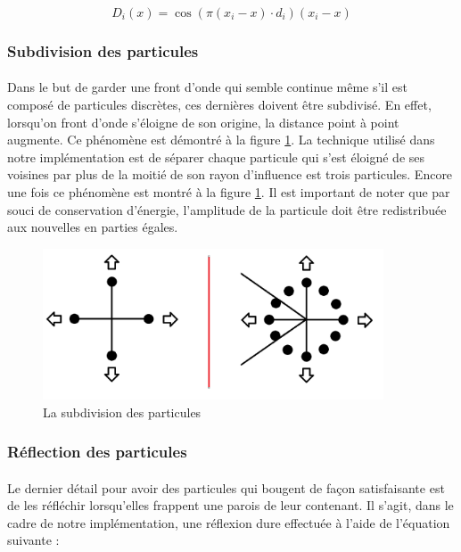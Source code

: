 \documentclass[a4paper, 12pt]{article} %
\begin{document}
	    \begin{equation}
	        D_{i}(x) = \cos(\pi {(x_{i} - x)} \cdot {d_{i}}) {(x_{i} - x)}
	    \end{equation}

	\subsubsection{Subdivision des particules}
	    \paragraph{}
	    Dans le but de garder une front d'onde qui semble continue même s'il est composé de particules discrètes, ces dernières
	    doivent être subdivisé. En effet, lorsqu'on front d'onde s'éloigne de son origine, la distance point à point augmente.
	    Ce phénomène est démontré à la figure \ref{subdivision}. La technique utilisé dans notre implémentation est de 
	    séparer chaque particule qui s'est éloigné de ses voisines par plus de la moitié de son rayon d'influence est trois particules.
	    Encore une fois ce phénomène est montré à la figure \ref{subdivision}. Il est important de noter que par souci de conservation
	    d'énergie, l'amplitude de la particule doit être redistribuée aux nouvelles en parties égales.

		\begin{figure}
			\centering
			\includegraphics[width=0.9\textwidth]{./PhotoRapport/subdivision.png}
			\caption{La subdivision des particules}
			\label{subdivision}
		\end{figure}


	\subsubsection{Réflection des particules}
	    \paragraph{}
	    Le dernier détail pour avoir des particules qui bougent de façon satisfaisante est de les réfléchir lorsqu'elles
	    frappent une parois de leur contenant. Il s'agit, dans le cadre de notre implémentation, une réflexion dure effectuée
	    à l'aide de l'équation suivante :
\end{document}
